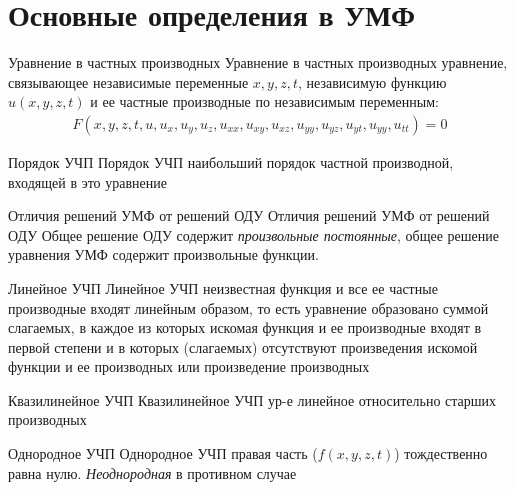 \documentclass{article}[12pt]
\begin{document}
\tableofcontents
\newpage
\printindex
\newpage

\section{Основные определения в УМФ}
\begin{definition}
    {Уравнение в частных производных}
    {Уравнение в частных производных}
    уравнение, связывающее независимые переменные $x,y,z,t$, независимую
    функцию $u(x,y,z,t)$ и ее частные производные по независимым
    переменным:
    \begin{eqnarray*}
        F(x,y,z,t,u,u_{x},u_{y},u_{z},u_{xx},u_{xy},u_{xz},u_{yy},u_{yz},
        u_{yt}, u_{yy}, u_{tt})=0
    \end{eqnarray*}
\end{definition}

\begin{definition}
    {Порядок УЧП}
    {Порядок УЧП}
    наибольший порядок частной производной, входящей в это уравнение
\end{definition}

\begin{definition}
    {Отличия решений УМФ от решений ОДУ}
    {Отличия решений УМФ от решений ОДУ}
    Общее решение ОДУ содержит \textit{произвольные постоянные}, общее
    решение уравнения УМФ содержит произвольные функции.
\end{definition}

\begin{definition}
    {Линейное УЧП}
    {Линейное УЧП}
    неизвестная функция и все ее частные производные входят линейным
    образом, то есть уравнение образовано суммой слагаемых, в каждое из
    которых искомая функция и ее производные входят в первой степени и в
    которых (слагаемых) отсутствуют произведения искомой функции и ее
    производных или произведение производных
\end{definition}

\begin{definition}
    {Квазилинейное УЧП}
    {Квазилинейное УЧП}
    ур-е линейное относительно старших производных
\end{definition}

\begin{definition}
    {Однородное УЧП}
    {Однородное УЧП}
    правая часть ($f(x,y,z,t)$) тождественно равна нулю.
    \textit{Неоднородная} в противном случае
\end{definition}
\end{document}
